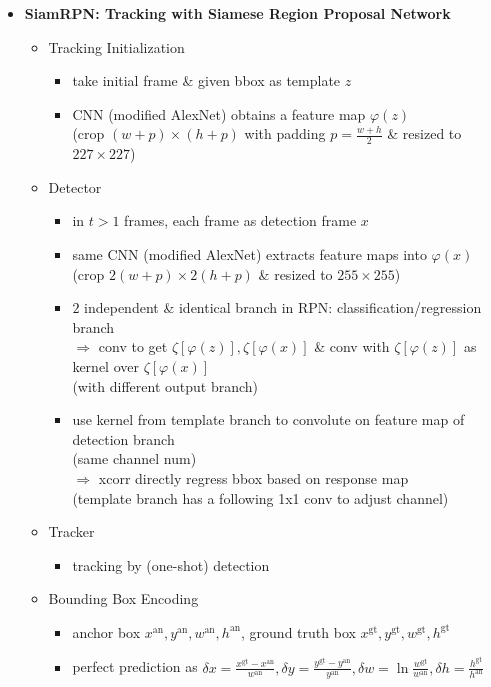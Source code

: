 \begin{itemize}
\item \textbf{SiamRPN: Tracking with Siamese Region Proposal Network}
	\begin{itemize}
	\item Tracking Initialization
		\begin{itemize}
		\item take initial frame \& given bbox as template $z$
		\item CNN (modified AlexNet) obtains a feature map $\varphi(z)$ \\
		(crop $(w+p)\times (h+p)$ with padding $p=\frac {w+h}2$ \& resized to $227\times227$)
		\end{itemize}
	\item Detector
		\begin{itemize}
		\item in $t>1$ frames, each frame as detection frame $x$
		\item same CNN (modified AlexNet) extracts feature maps into $\varphi(x)$\\
		(crop $2(w+p)\times2(h+p)$ \& resized to $255\times255$)
		\item $2$ independent \& identical branch in RPN: classification/regression branch \\
		$\Rightarrow$ conv to get $\zeta[\varphi(z)], \zeta[\varphi(x)]$ \& conv with $\zeta[\varphi(z)]$ as kernel over $\zeta[\varphi(x)]$ \\
		(with different output branch)
		\item use kernel from template branch to convolute on feature map of detection branch \\
		(same channel num) \\
		$\Rightarrow$ xcorr directly regress bbox based on response map \\
		(template branch has a following 1x1 conv to adjust channel)
		\end{itemize}
	\item Tracker
		\begin{itemize}
		\item tracking by (one-shot) detection
		\end{itemize}
	\item Bounding Box Encoding
		\begin{itemize}
		\item anchor box $x^\text{an},y^\text{an},w^\text{an},h^\text{an}$, ground truth box $x^\text{gt},y^\text{gt},w^\text{gt},h^\text{gt}$
		\item perfect prediction as $\delta x = \frac {x^\text{gt}-x^\text{an}}{w^\text{an}}, \delta y = \frac{y^\text{gt}-y^\text{an}}{y^\text{an}}, \delta w = \ln \frac {w^\text{gt}}{w^\text{an}}, \delta h = \frac{h^\text{gt}}{h^\text{an}}$ \\

\end{itemize}
\end{itemize}
\end{itemize}
